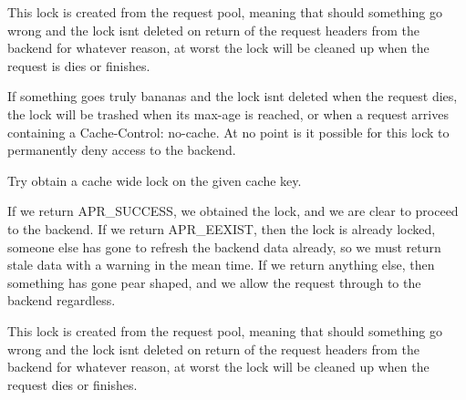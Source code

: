 This lock is created from the request pool, meaning that should something go wrong and the lock isn\textquotesingle{}t deleted on return of the request headers from the backend for whatever reason, at worst the lock will be cleaned up when the request is dies or finishes.

If something goes truly bananas and the lock isn\textquotesingle{}t deleted when the request dies, the lock will be trashed when its max-\/age is reached, or when a request arrives containing a Cache-\/\+Control\+: no-\/cache. At no point is it possible for this lock to permanently deny access to the backend.

Try obtain a cache wide lock on the given cache key.

If we return A\+P\+R\+\_\+\+S\+U\+C\+C\+E\+SS, we obtained the lock, and we are clear to proceed to the backend. If we return A\+P\+R\+\_\+\+E\+E\+X\+I\+ST, then the lock is already locked, someone else has gone to refresh the backend data already, so we must return stale data with a warning in the mean time. If we return anything else, then something has gone pear shaped, and we allow the request through to the backend regardless.

This lock is created from the request pool, meaning that should something go wrong and the lock isn\textquotesingle{}t deleted on return of the request headers from the backend for whatever reason, at worst the lock will be cleaned up when the request dies or finishes.

